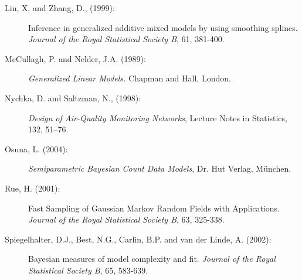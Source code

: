 \documentclass[11pt,a4paper,twoside]{bayesxarticle}
\begin{document}
\begin{description}
\item[Lin, X. and Zhang, D., (1999):]
Inference in generalized additive mixed models by using smoothing
splines. {\it Journal of the Royal Statistical Society B}, 61,
381-400.

\item[McCullagh, P. and Nelder, J.A. (1989):] {\em Generalized Linear Models.} Chapman and Hall, London.

\item[Nychka, D. and Saltzman, N., (1998):]
{\it Design of Air-Quality Monitoring Networks},
Lecture Notes in Statistics, 132, 51--76.

\item[Osuna, L. (2004):] {\it Semiparametric Bayesian Count Data
Models}, Dr. Hut Verlag, M\"{u}nchen.

\item[Rue, H. (2001):] Fast Sampling of Gaussian Markov Random Fields with Applications.
{\em Journal of the Royal Statistical Society B}, 63, 325-338.

\item[Spiegelhalter, D.J., Best, N.G., Carlin, B.P. and van der Linde, A. (2002):]
Bayesian measures of model complexity and fit. {\em Journal of the
Royal Statistical Society B}, 65, 583-639.

\end{description}


\hypertarget{index}{}
\end{document}
